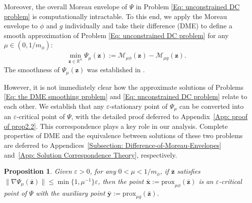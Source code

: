 \documentclass{article}
\theoremstyle{plain}
\newtheorem{proposition}{Proposition}[section]
\theoremstyle{definition}
\theoremstyle{remark}
\newcommand{\RR}{\mathbb{R}}
\newcommand{\prox}{\mathrm{prox}}
\newcommand{\bx}{\bm{x}}
\newcommand{\bz}{\bm{z}}
\newcommand{\by}{\bm{y}}
\newcommand{\calM}{\mathcal{M}}
\numberwithin{equation}{section}
\begin{document}
Moreover, the overall Moreau envelope of $\Psi$ in Problem \eqref{Eq: unconstrained DC problem} is computationally intractable. To this end, we apply the Moreau envelope to $\phi$ and $g$ individually and take their difference (DME) to define a smooth approximation of Problem \eqref{Eq: unconstrained DC problem} for any $\mu \in (0, 1/m_{\phi})$:
\begin{align}
\label{Eq: the DME smoothing problem}
 \min\limits_{\bz \in \RR^n }\Psi_{\mu}(\bz) := \calM_{\mu \phi}(\bz) - \calM_{\mu g}(\bz).
\end{align}
The smoothness of \( \Psi_{\mu}(\bz)\) was
established in \citet{hiriart1991regularize}.

However, it is not immediately clear how the approximate solutions of 
Problems \eqref{Eq: the DME smoothing problem} and \eqref{Eq: unconstrained DC problem} relate to each other. We establish that any $\varepsilon$-stationary point of $\Psi_{\mu}$ 
can be converted into an $\varepsilon$-critical point of $\Psi$, with the detailed proof deferred to Appendix~\ref{App: proof of prop2.2}. This correspondence plays a key role in our analysis. Complete properties of DME and the equivalence between solutions of these two problems are deferred to Appendices~\ref{Subsection: Difference-of-Moreau-Envelopes} and~\ref{App: Solution Correspondence Theory}, respectively.
\begin{proposition}
\label{Prop: approximate correspondence}
Given $\varepsilon > 0$, for any $0 < \mu < 1/m_{\phi}$, if $\bar{\bz}$ satisfies $\| \nabla \Psi_{\mu}(\bar{\bz})\| \leq \min\{1, \mu^{-1}\} \varepsilon$, then the point \(\bar{\bx} := \prox_{\mu \phi}(\bar{\bz})\) is an \textit{$\varepsilon$-critical point} of $\Psi$ with the auxiliary point \(\bar{\by} := \prox_{\mu g}(\bar{\bz}) \).
\end{proposition}
\end{document}
